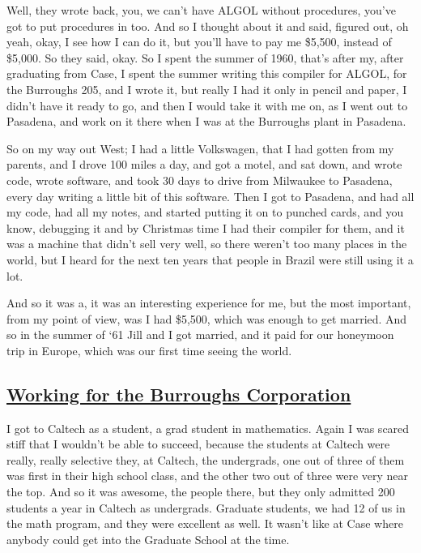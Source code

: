 \documentclass[]{article}
\begin{document}
Well, they wrote back, you, we can't have ALGOL without procedures,
you've got to put procedures in too. And so I thought about it and said,
figured out, oh yeah, okay, I see how I can do it, but you'll have to
pay me \$5,500, instead of \$5,000. So they said, okay. So I spent the
summer of 1960, that's after my, after graduating from Case, I spent the
summer writing this compiler for ALGOL, for the Burroughs 205, and I
wrote it, but really I had it only in pencil and paper, I didn't have it
ready to go, and then I would take it with me on, as I went out to
Pasadena, and work on it there when I was at the Burroughs plant in
Pasadena.

So on my way out West; I had a little Volkswagen, that I had gotten from
my parents, and I drove 100 miles a day, and got a motel, and sat down,
and wrote code, wrote software, and took 30 days to drive from Milwaukee
to Pasadena, every day writing a little bit of this software. Then I got
to Pasadena, and had all my code, had all my notes, and started putting
it on to punched cards, and you know, debugging it and by Christmas time
I had their compiler for them, and it was a machine that didn't sell
very well, so there weren't too many places in the world, but I heard
for the next ten years that people in Brazil were still using it a lot.

And so it was a, it was an interesting experience for me, but the most
important, from my point of view, was I had \$5,500, which was enough to
get married. And so in the summer of `61 Jill and I got married, and it
paid for our honeymoon trip in Europe, which was our first time seeing
the world.

\subsection{\texorpdfstring{\href{http://webofstories.com/play/17087}{Working
for the Burroughs
Corporation}}{Working for the Burroughs Corporation}}\label{working-for-the-burroughs-corporation}

I got to Caltech as a student, a grad student in mathematics. Again I
was scared stiff that I wouldn't be able to succeed, because the
students at Caltech were really, really selective they, at Caltech, the
undergrads, one out of three of them was first in their high school
class, and the other two out of three were very near the top. And so it
was awesome, the people there, but they only admitted 200 students a
year in Caltech as undergrads. Graduate students, we had 12 of us in the
math program, and they were excellent as well. It wasn't like at Case
where anybody could get into the Graduate School at the time.
\end{document}

